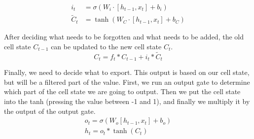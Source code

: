 \documentclass[journal,article,submit,moreauthors,pdftex]{Definitions/mdpi}
\begin{document}
\begin{equation}
    \begin{aligned}
    i_{t} &=\sigma\left(W_{i} \cdot\left[h_{t-1}, x_{t}\right]+b_{i}\right) \\
    \tilde{C}_{t} &=\tanh \left(W_{C} \cdot\left[h_{t-1}, x_{t}\right]+b_{C}\right)
    \end{aligned}
\end{equation}
\par After deciding what needs to be forgotten and what needs to be added, the old cell state $C_{t-1}$ can be updated to the new cell state $C_{t}$.
\begin{equation}
    C_{t}=f_{t} * C_{t-1}+i_{t} * \tilde{C}_{t}
\end{equation}
\par Finally, we need to decide what to export. This output is based on our cell state, but will be a filtered part of the value. First, we run an output gate to determine which part of the cell state we are going to output. Then we put the cell state into the tanh (pressing the value between -1 and 1), and finally we multiply it by the output of the output gate.
\begin{equation}
    \begin{array}{l}
    o_{t}=\sigma\left(W_{o}\left[h_{t-1}, x_{t}\right]+b_{o}\right) \\
    h_{t}=o_{t} * \tanh \left(C_{t}\right)
    \end{array}
\end{equation}
\end{document}

